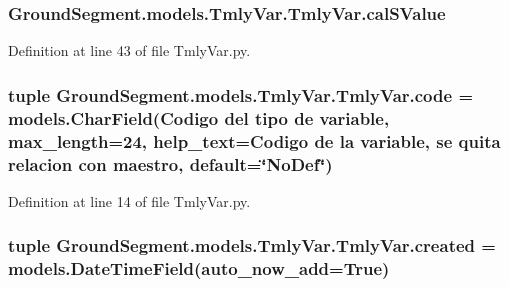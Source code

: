 \subsubsection[{cal\+S\+Value}]{\setlength{\rightskip}{0pt plus 5cm}Ground\+Segment.\+models.\+Tmly\+Var.\+Tmly\+Var.\+cal\+S\+Value}\label{class_ground_segment_1_1models_1_1_tmly_var_1_1_tmly_var_ae310487e7ceeb1bbeae164bf4aec0290}


Definition at line 43 of file Tmly\+Var.\+py.

\hypertarget{class_ground_segment_1_1models_1_1_tmly_var_1_1_tmly_var_a25d017347ade2540b37c09596f233f0f}{}
\subsubsection[{code}]{\setlength{\rightskip}{0pt plus 5cm}tuple Ground\+Segment.\+models.\+Tmly\+Var.\+Tmly\+Var.\+code = models.\+Char\+Field(\textquotesingle{}Codigo del tipo de variable\textquotesingle{}, max\+\_\+length=24, help\+\_\+text=\textquotesingle{}Codigo de la variable, se quita relacion con maestro\textquotesingle{}, default=\char`\"{}No\+Def\char`\"{})\hspace{0.3cm}{\ttfamily [static]}}\label{class_ground_segment_1_1models_1_1_tmly_var_1_1_tmly_var_a25d017347ade2540b37c09596f233f0f}


Definition at line 14 of file Tmly\+Var.\+py.

\hypertarget{class_ground_segment_1_1models_1_1_tmly_var_1_1_tmly_var_acc0d1d6a558e6194dfd4fbd375df6f67}{}
\subsubsection[{created}]{\setlength{\rightskip}{0pt plus 5cm}tuple Ground\+Segment.\+models.\+Tmly\+Var.\+Tmly\+Var.\+created = models.\+Date\+Time\+Field(auto\+\_\+now\+\_\+add=True)\hspace{0.3cm}{\ttfamily [static]}}\label{class_ground_segment_1_1models_1_1_tmly_var_1_1_tmly_var_acc0d1d6a558e6194dfd4fbd375df6f67}


